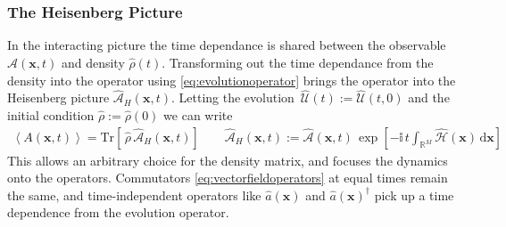 \documentclass{article}[12pt]
\numberwithin{equation}{section}
\begin{document}
\subsubsection{The Heisenberg Picture}\vspace{-10pt}
In the interacting picture the time dependance is shared between the observable
$\hat{\mathcal{A}}(\mathbf{x},t)$ and density $\hat\rho(t)$. Transforming out the
time dependance from the density into the operator using \eqref{eq:evolutionoperator}
brings the operator into the Heisenberg picture $\hat{\mathcal{A}}_H(\mathbf{x},t)$.
Letting the evolution $\,\hat{\mathcal{U}}(t):=\hat{\mathcal{U}}(t,0)$ and the
initial condition $\hat\rho:=\hat\rho(0)$ we can write
\begin{align}
	\left\langle A(\mathbf{x},t) \right\rangle=
	\text{Tr}\left[
	\,\hat\rho \,\hat{\mathcal{A}}_H(\mathbf{x},t)
	\right]
\qquad
\hat{\mathcal{A}}_H(\mathbf{x},t):=
\hat{\mathcal{A}}(\mathbf{x},t)\,\exp\left[{-\mathbb{i}\,t
\int_{\mathbb{R}^M}\!\hat{\mathcal{H}}(\mathbf{x})\,\mathrm{d}\mathbf{x}}
\right]
\label{eq:heisenbergpicture}
\end{align}
This allows an arbitrary choice for the density matrix, and focuses the dynamics
onto the operators. Commutators \eqref{eq:vectorfieldoperators} at equal times remain
the same, and time-independent operators like $\hat{a}(\mathbf{x})$ and
$\hat{a}(\mathbf{x})^{\dagger}$ pick up a time dependence from the evolution operator.
\end{document}
